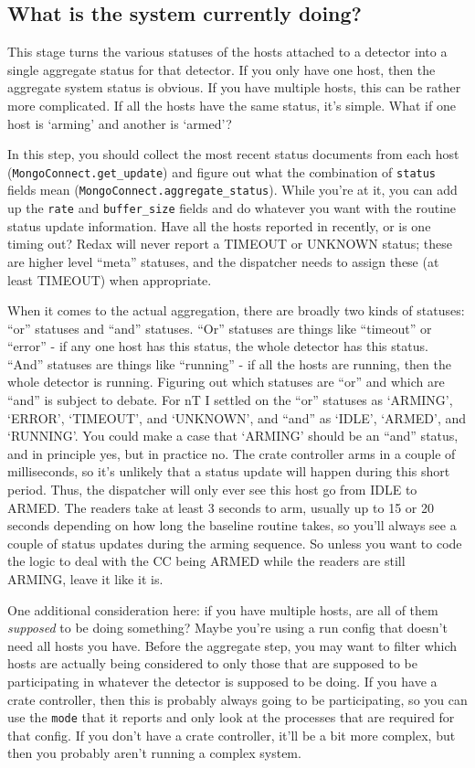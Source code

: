 \subsection{What is the system currently doing?}

This stage turns the various statuses of the hosts attached to a detector into a single aggregate status for that detector.
If you only have one host, then the aggregate system status is obvious.
If you have multiple hosts, this can be rather more complicated.
If all the hosts have the same status, it's simple.
What if one host is `arming' and another is `armed'?

In this step, you should collect the most recent status documents from each host (\texttt{MongoConnect.get\_update}) and figure out what the combination of \texttt{status} fields mean (\texttt{MongoConnect.aggregate\_status}).
While you're at it, you can add up the \texttt{rate} and \texttt{buffer\_size} fields and do whatever you want with the routine status update information.
Have all the hosts reported in recently, or is one timing out?
Redax will never report a TIMEOUT or UNKNOWN status; these are higher level ``meta'' statuses, and the dispatcher needs to assign these (at least TIMEOUT) when appropriate.

When it comes to the actual aggregation, there are broadly two kinds of statuses: ``or'' statuses and ``and'' statuses.
``Or'' statuses are things like ``timeout'' or ``error'' - if any one host has this status, the whole detector has this status.
``And'' statuses are things like ``running'' - if all the hosts are running, then the whole detector is running.
Figuring out which statuses are ``or'' and which are ``and'' is subject to debate.
For nT I settled on the ``or'' statuses as `ARMING', `ERROR', `TIMEOUT', and `UNKNOWN', and ``and'' as `IDLE', `ARMED', and `RUNNING'.
You could make a case that `ARMING' should be an ``and'' status, and in principle yes, but in practice no.
The crate controller arms in a couple of milliseconds, so it's unlikely that a status update will happen during this short period.
Thus, the dispatcher will only ever see this host go from IDLE to ARMED.
The readers take at least 3 seconds to arm, usually up to 15 or 20 seconds depending on how long the baseline routine takes, so you'll always see a couple of status updates during the arming sequence.
So unless you want to code the logic to deal with the CC being ARMED while the readers are still ARMING, leave it like it is.

One additional consideration here: if you have multiple hosts, are all of them \emph{supposed} to be doing something?
Maybe you're using a run config that doesn't need all hosts you have.
Before the aggregate step, you may want to filter which hosts are actually being considered to only those that are supposed to be participating in whatever the detector is supposed to be doing.
If you have a crate controller, then this is probably always going to be participating, so you can use the \texttt{mode} that it reports and only look at the processes that are required for that config.
If you don't have a crate controller, it'll be a bit more complex, but then you probably aren't running a complex system.

